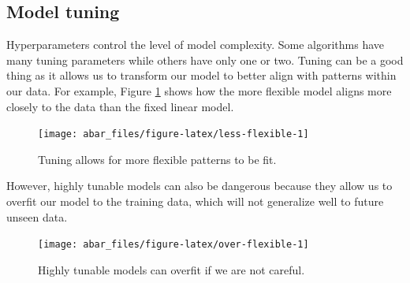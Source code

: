 \documentclass[]{book}
\newenvironment{Shaded}{\begin{snugshade}}{\end{snugshade}}
\newcommand{\CommentTok}[1]{\textcolor[rgb]{0.56,0.35,0.01}{\textit{#1}}}
\newcommand{\DataTypeTok}[1]{\textcolor[rgb]{0.13,0.29,0.53}{#1}}
\newcommand{\DecValTok}[1]{\textcolor[rgb]{0.00,0.00,0.81}{#1}}
\newcommand{\KeywordTok}[1]{\textcolor[rgb]{0.13,0.29,0.53}{\textbf{#1}}}
\newcommand{\NormalTok}[1]{#1}
\newcommand{\OperatorTok}[1]{\textcolor[rgb]{0.81,0.36,0.00}{\textbf{#1}}}
\newcommand{\StringTok}[1]{\textcolor[rgb]{0.31,0.60,0.02}{#1}}
\theoremstyle{definition}
\theoremstyle{definition}
\theoremstyle{definition}
\theoremstyle{remark}
\begin{document}
\begin{Shaded}
\end{Shaded}

\hypertarget{tune}{%
\subsection{Model tuning}\label{tune}}

Hyperparameters control the level of model complexity. Some algorithms
have many tuning parameters while others have only one or two. Tuning
can be a good thing as it allows us to transform our model to better
align with patterns within our data. For example, Figure
\ref{fig:less-flexible} shows how the more flexible model aligns more
closely to the data than the fixed linear model.

\begin{figure}

{\centering \texttt{[image: abar\_files/figure-latex/less-flexible-1]} 

}

\caption{Tuning allows for more flexible patterns to be fit.}\label{fig:less-flexible}
\end{figure}

However, highly tunable models can also be dangerous because they allow
us to overfit our model to the training data, which will not generalize
well to future unseen data.

\begin{figure}

{\centering \texttt{[image: abar\_files/figure-latex/over-flexible-1]} 

}

\caption{Highly tunable models can overfit if we are not careful.}\label{fig:over-flexible}
\end{figure}
\end{document}
